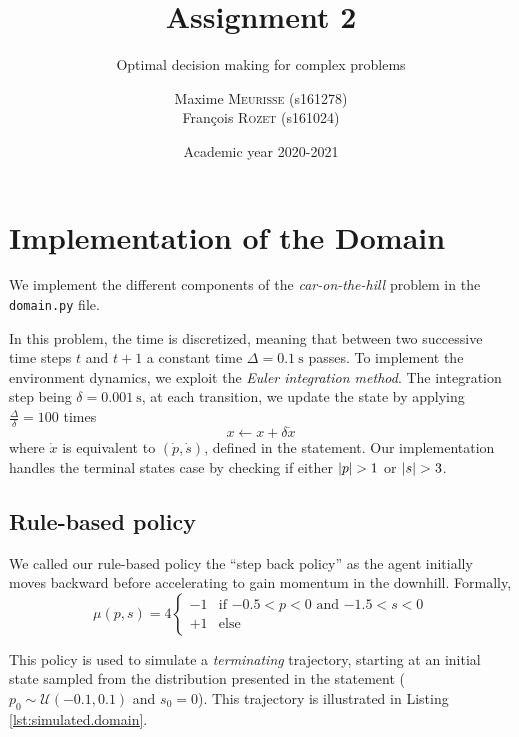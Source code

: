 \documentclass[a4paper, 12pt]{article}
\institute{University of Liège}
\title{Assignment 2}
\subtitle{Optimal decision making for complex problems}
\author{%
Maxime \textsc{Meurisse} (s161278)\\%
François \textsc{Rozet} (s161024)%
}
\date{Academic year 2020-2021}
\begin{document}
    \maketitle
    
    \section{Implementation of the Domain}
    
    We implement the different components of the \emph{car-on-the-hill} problem in the \texttt{domain.py} file.
    
    In this problem, the time is discretized, meaning that between two successive time steps $t$ and $t + 1$ a constant time $\Delta = \SI{0.1}{\second}$ passes. To implement the environment dynamics, we exploit the \emph{Euler integration method}. The integration step being $\delta = \SI{0.001}{\second}$, at each transition, we update the state by applying $\frac{\Delta}{\delta} = \num{100}$ times
    \begin{equation}
        x \gets x + \delta \dot{x}
    \end{equation}
    where $\dot{x}$ is equivalent to $(\dot{p}, \dot{s})$, defined in the statement. Our implementation handles the terminal states case by checking if either $\left|p\right| > 1$ or $\left|s\right| > 3$.
    
    \subsection{Rule-based policy}
    
    We called our rule-based policy the \enquote{step back policy} as the agent initially moves backward before accelerating to gain momentum in the downhill. Formally,
    \begin{equation}\label{eq:stepback.policy}
        \mu(p, s) = 4 \begin{cases}
            -1 & \text{if } \num{-0.5} < p < 0 \text{ and } \num{-1.5} < s < 0 \\
            +1 & \text{else}
        \end{cases}
    \end{equation}
    
    This policy is used to simulate a \emph{terminating} trajectory, starting at an initial state sampled from the distribution presented in the statement ($p_0 \sim \mathcal{U}(\num{-0.1}, \num{0.1})$ and $s_0 = 0$). This trajectory is illustrated in Listing \ref{lst:simulated.domain}.
    
\end{document}
